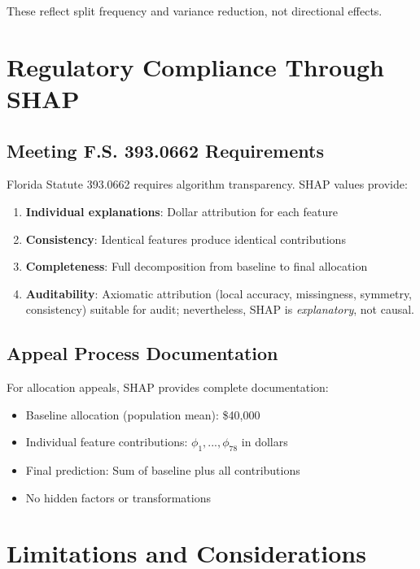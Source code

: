 These reflect split frequency and variance reduction, not directional effects.

\section{Regulatory Compliance Through SHAP}
\subsection{Meeting F.S. 393.0662 Requirements}
Florida Statute 393.0662 requires algorithm transparency. SHAP values provide:
%
\begin{enumerate}
    \item \textbf{Individual explanations}: Dollar attribution for each feature
    \item \textbf{Consistency}: Identical features produce identical contributions
    \item \textbf{Completeness}: Full decomposition from baseline to final allocation
    \item \textbf{Auditability}: Axiomatic attribution (local accuracy, missingness, symmetry, consistency) suitable for audit; nevertheless, SHAP is \emph{explanatory}, not causal.
\end{enumerate}

\subsection{Appeal Process Documentation}

For allocation appeals, SHAP provides complete documentation:

\begin{itemize}
    \item Baseline allocation (population mean): \$40,000
    \item Individual feature contributions: $\phi_1, ..., \phi_{78}$ in dollars
    \item Final prediction: Sum of baseline plus all contributions
    \item No hidden factors or transformations
\end{itemize}

\section{Limitations and Considerations}

